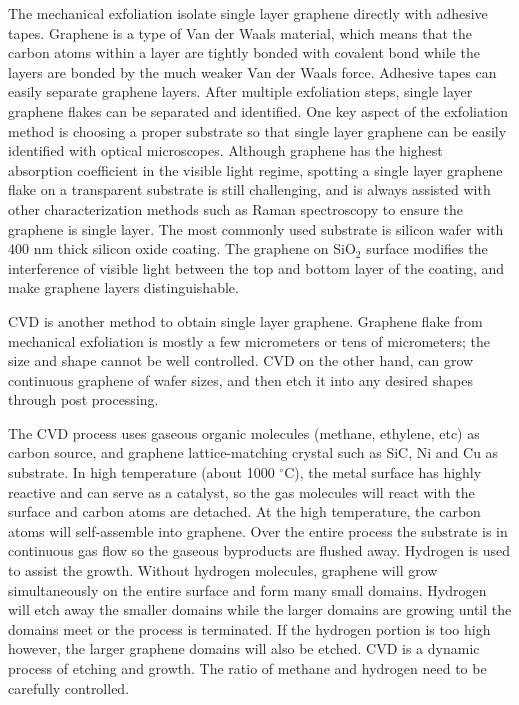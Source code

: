 \documentclass[pdflatex, sectionletters, 12pt]{pittetd}    %
\begin{document}
The mechanical exfoliation isolate single layer graphene directly with adhesive tapes. Graphene is a type of Van der Waals material, which means that the carbon atoms within a layer are tightly bonded with covalent bond while the layers are bonded by the much weaker Van der Waals force. Adhesive tapes can easily separate graphene layers. After multiple exfoliation steps, single layer graphene flakes can be separated and identified\cite{}. One key aspect of the exfoliation method is choosing a proper substrate so that single layer graphene can be easily identified with optical microscopes. Although graphene has the highest absorption coefficient in the visible light regime\cite{}, spotting a single layer graphene flake on a transparent substrate is still challenging, and is always assisted with other characterization methods such as Raman spectroscopy\cite{} to ensure the graphene is single layer. The most commonly used substrate is silicon wafer with 400 nm thick silicon oxide coating. The graphene on SiO$_2$ surface modifies the interference of visible light between the top and bottom layer of the coating, and make graphene layers distinguishable\cite{}. 

CVD is another method to obtain single layer graphene. Graphene flake from mechanical exfoliation is mostly a few micrometers or tens of micrometers; the size and shape cannot be well controlled. CVD on the other hand, can grow continuous graphene of wafer sizes\cite{}, and then etch it into any desired shapes through post processing. 

The CVD process uses gaseous organic molecules (methane, ethylene, etc) as carbon source, and graphene lattice-matching crystal such as SiC, Ni and Cu as substrate. In high temperature (about 1000 $^{\circ}$C), the metal surface has highly reactive and can serve as a catalyst, so the gas molecules will react with the surface and carbon atoms are detached. At the high temperature, the carbon atoms will self-assemble into graphene. Over the entire process the substrate is in continuous gas flow so the gaseous byproducts are flushed away. Hydrogen is used to assist the growth. Without hydrogen molecules, graphene will grow simultaneously on the entire surface and form many small domains. Hydrogen will etch away the smaller domains while the larger domains are growing\cite{} until the domains meet or the process is terminated. If the hydrogen portion is too high however, the larger graphene domains will also be etched. CVD is a dynamic process of etching and growth. The ratio of methane and hydrogen need to be carefully controlled.
\end{document}
